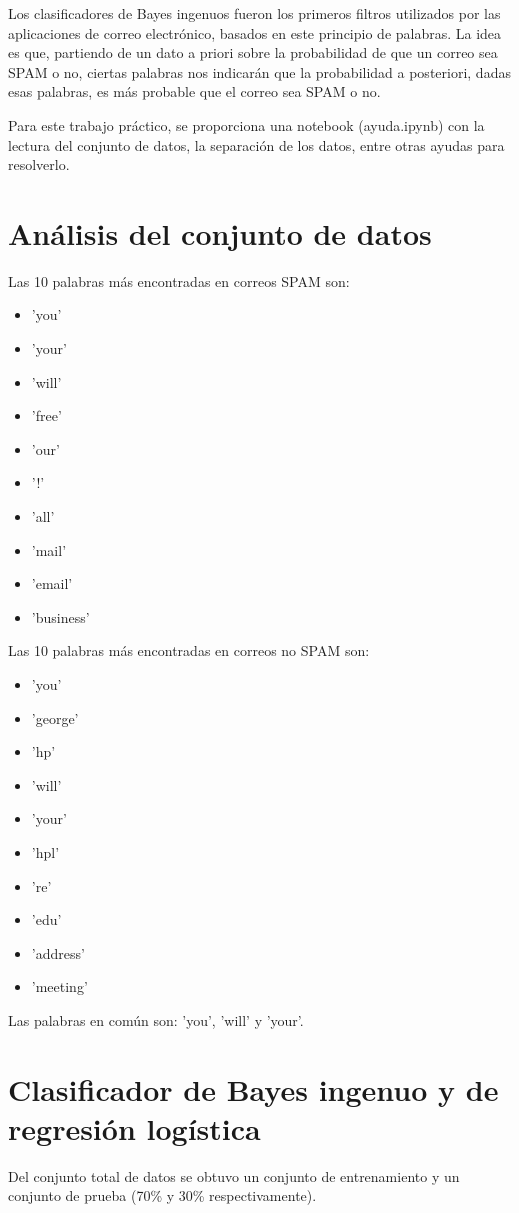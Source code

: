 \documentclass[onecolumn]{IEEEtran}
\begin{document}
Los clasificadores de Bayes ingenuos fueron los primeros filtros utilizados por las aplicaciones de correo electrónico, basados en este principio de palabras. La idea es que, partiendo de un dato a priori sobre la probabilidad de que un correo sea SPAM o no, ciertas palabras nos indicarán que la probabilidad a posteriori, dadas esas palabras, es más probable que el correo sea SPAM o no.

Para este trabajo práctico, se proporciona una notebook (ayuda.ipynb) con la lectura del conjunto de datos, la separación de los datos, entre otras ayudas para resolverlo.

\newpage
\section*{Análisis del conjunto de datos}
Las 10 palabras más encontradas en correos SPAM son:
\begin{itemize}
    \item 'you'
    \item 'your'
    \item 'will'
    \item 'free'
    \item 'our'
    \item '!'
    \item 'all'
    \item 'mail'
    \item 'email'
    \item 'business'
\end{itemize}

Las 10 palabras más encontradas en correos no SPAM son:
\begin{itemize}
    \item 'you'
    \item 'george'
    \item 'hp'
    \item 'will'
    \item 'your'
    \item 'hpl'
    \item 're'
    \item 'edu'
    \item 'address'
    \item 'meeting'
\end{itemize}

Las palabras en común son: 'you', 'will' y 'your'.

\section*{Clasificador de Bayes ingenuo y de regresión logística}
Del conjunto total de datos se obtuvo un conjunto de entrenamiento y un conjunto de prueba (70\% y 30\% respectivamente).
\end{document}
